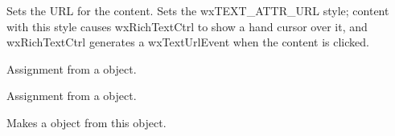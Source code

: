 \label{wxrichtextattrseturl}


Sets the URL for the content. Sets the wxTEXT\_ATTR\_URL style; content with this style
causes wxRichTextCtrl to show a hand cursor over it, and wxRichTextCtrl generates
a wxTextUrlEvent when the content is clicked.

\label{wxrichtextattroperatorassign}


Assignment from a  object.


Assignment from a  object.

\label{wxrichtextattrwxtextattrex}


Makes a  object from this object.


